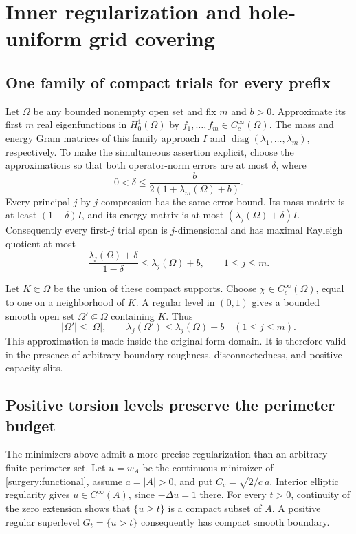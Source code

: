 \documentclass[11pt,reqno]{amsart}
\numberwithin{equation}{section}
\newcommand{\abs}[1]{\lvert#1\rvert}
\newcommand{\Om}{\Omega}
\begin{document}
\section{Inner regularization and hole-uniform grid covering}
\label{grid:construction}

\subsection{One family of compact trials for every prefix}
\label{surgery:compact-trials}

Let \(\Om\) be any bounded nonempty open set and fix \(m\) and \(b>0\).
Approximate its first \(m\) real eigenfunctions in \(H^1_0(\Om)\)
by \(f_1,\ldots,f_m\in C^\infty_c(\Om)\).  The mass and energy Gram
matrices of this family approach \(I\) and
\(\operatorname{diag}(\lambda_1,\ldots,\lambda_m)\), respectively.
To make the simultaneous assertion explicit, choose the
approximations so that both operator-norm errors are at most
\(\delta\), where
\[
 0<\delta\le\frac{b}{2(1+\lambda_m(\Om)+b)}.
\]
Every principal \(j\)-by-\(j\) compression has the same error bound.
Its mass matrix is at least \((1-\delta)I\), and its energy matrix
is at most \((\lambda_j(\Om)+\delta)I\).  Consequently every
first-\(j\) trial span is \(j\)-dimensional and has maximal
Rayleigh quotient at most
\[
 \frac{\lambda_j(\Om)+\delta}{1-\delta}
 \le\lambda_j(\Om)+b,\qquad 1\le j\le m.
\]

Let \(K\Subset\Om\) be the union of these compact supports.  Choose
\(\chi\in C^\infty_c(\Om)\), equal to one on a neighborhood of \(K\).
A regular level in \((0,1)\) gives a bounded smooth open set
\(\Om'\Subset\Om\) containing \(K\).  Thus
\begin{equation}
 \abs{\Om'}\le\abs{\Om},\qquad
 \lambda_j(\Om')\le\lambda_j(\Om)+b\quad(1\le j\le m).
 \label{surgery:inner}
\end{equation}
This approximation is made inside the original form domain.  It is
therefore valid in the presence of arbitrary boundary roughness,
disconnectedness, and positive-capacity slits.

\subsection{Positive torsion levels preserve the perimeter budget}
\label{surgery:bv-section}

The minimizers above admit a more precise regularization than an
arbitrary finite-perimeter set.  Let \(u=w_A\) be the continuous
minimizer of \eqref{surgery:functional}, assume \(a=\abs A>0\), and
put \(C_c=\sqrt{2/c}\,a\).  Interior elliptic regularity gives
\(u\in C^\infty(A)\), since \(-\Delta u=1\) there.  For every
\(t>0\), continuity of the zero extension shows that
\(\{u\ge t\}\) is a compact subset of \(A\).  A positive regular
superlevel \(G_t=\{u>t\}\) consequently has compact smooth boundary.
\end{document}
